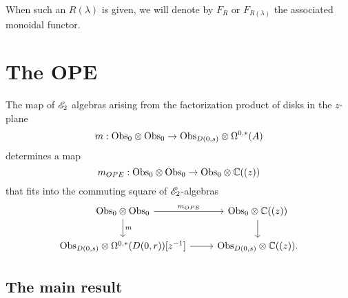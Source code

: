 \documentclass[11pt]{amsart}
\begin{document}
When such an $R(\lambda)$ is given, we will denote by $F_R$ or $F_{R(\lambda)}$ the associated monoidal functor. 

\section{The OPE}
\def\Obsmod{{\rm Mod}_{\Obs_0}}
\def\Obslmod{{\rm Mod}_{\Obs_0}((\lambda))}

\begin{prop}
The map of $\mathscr E_2$ algebras arising from the factorization product of disks in the $z$-plane
\[
m : {\rm Obs}_{0} \otimes {\rm Obs}_{0} \to {\rm Obs}_{D(0,s)} \otimes \Omega^{0,*}(A)
\]
determines a map
\[
m_{OPE} : {\rm Obs}_0 \otimes {\rm Obs}_0 \to {\rm Obs}_0 \otimes \mathbb C((z))
\]
that fits into the commuting square of $\mathscr E_2$-algebras
\[
\begin{tikzcd}
\Obs_0 \tensor \Obs_0 \ar[r, "m_{OPE}"] \ar[d, "m"] & \Obs_0 \tensor \CC((z)) \ar[d] \\
\Obs_{D(0,s)} \tensor \Omega^{0,*}(D(0,r)) [z^{-1}] \ar[r] & \Obs_{D(0,s)} \tensor \CC((z)) .
\end{tikzcd}
\]
\end{prop}


\subsection{The main result}
\end{document}
